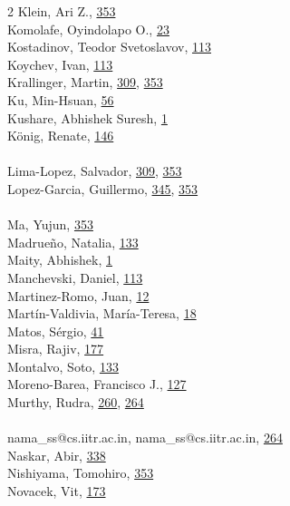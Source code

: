 \documentclass[11pt,oneside]{book}
\begin{document}
\begin{multicols}{2}
Klein, Ari Z., \hyperlink{page.353}{353}\\
Komolafe, Oyindolapo O., \hyperlink{page.23}{23}\\
Kostadinov, Teodor Svetoslavov, \hyperlink{page.113}{113}\\
Koychev, Ivan, \hyperlink{page.113}{113}\\
Krallinger, Martin, \hyperlink{page.309}{309}, \hyperlink{page.353}{353}\\
Ku, Min-Hsuan, \hyperlink{page.56}{56}\\
Kushare, Abhishek Suresh, \hyperlink{page.1}{1}\\
König, Renate, \hyperlink{page.146}{146}\\
\\ %
Lima-Lopez, Salvador, \hyperlink{page.309}{309}, \hyperlink{page.353}{353}\\
Lopez-Garcia, Guillermo, \hyperlink{page.345}{345}, \hyperlink{page.353}{353}\\
\\ %
Ma, Yujun, \hyperlink{page.353}{353}\\
Madrueño, Natalia, \hyperlink{page.133}{133}\\
Maity, Abhishek, \hyperlink{page.1}{1}\\
Manchevski, Daniel, \hyperlink{page.113}{113}\\
Martinez-Romo, Juan, \hyperlink{page.12}{12}\\
Martín-Valdivia, María-Teresa, \hyperlink{page.18}{18}\\
Matos, Sérgio, \hyperlink{page.41}{41}\\
Misra, Rajiv, \hyperlink{page.177}{177}\\
Montalvo, Soto, \hyperlink{page.133}{133}\\
Moreno-Barea, Francisco J., \hyperlink{page.127}{127}\\
Murthy, Rudra, \hyperlink{page.260}{260}, \hyperlink{page.264}{264}\\
\\ %
nama\_ss@cs.iitr.ac.in, nama\_ss@cs.iitr.ac.in, \hyperlink{page.264}{264}\\
Naskar, Abir, \hyperlink{page.338}{338}\\
Nishiyama, Tomohiro, \hyperlink{page.353}{353}\\
Novacek, Vit, \hyperlink{page.173}{173}\\
\\ %

\end{multicols}
\end{document}

